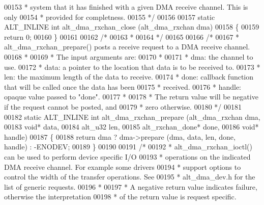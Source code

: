 \begin{DoxyCode}
00153 \textcolor{comment}{ * system that it has finished with a given DMA receive channel. This is only}
00154 \textcolor{comment}{ * provided for completness.}
00155 \textcolor{comment}{ */}
00156 
00157 \textcolor{keyword}{static} ALT_INLINE \textcolor{keywordtype}{int} alt_dma_rxchan_close (alt_dma_rxchan dma)
00158 \{
00159   \textcolor{keywordflow}{return} 0;
00160 \}
00161 
00162 \textcolor{comment}{/*}
00163 \textcolor{comment}{ *}
00164 \textcolor{comment}{ */}
00165 
00166 \textcolor{comment}{/*}
00167 \textcolor{comment}{ * alt\_dma\_rxchan\_prepare() posts a receive request to a DMA receive channel.}
00168 \textcolor{comment}{ * }
00169 \textcolor{comment}{ * The input arguments are:}
00170 \textcolor{comment}{ *}
00171 \textcolor{comment}{ * dma: the channel to use.}
00172 \textcolor{comment}{ * data: a pointer to the location that data is to be received to.}
00173 \textcolor{comment}{ * len: the maximum length of the data to receive. }
00174 \textcolor{comment}{ * done: callback function that will be called once the data has been }
00175 \textcolor{comment}{ *       received.}
00176 \textcolor{comment}{ * handle: opaque value passed to "done".}
00177 \textcolor{comment}{ *}
00178 \textcolor{comment}{ * The return value will be negative if the request cannot be posted, and}
00179 \textcolor{comment}{ * zero otherwise.}
00180 \textcolor{comment}{ */}
00181 
00182 \textcolor{keyword}{static} ALT_INLINE \textcolor{keywordtype}{int} alt_dma_rxchan_prepare (alt_dma_rxchan   dma, 
00183                                               \textcolor{keywordtype}{void}*            data,
00184                                               alt_u32          len,
00185                                               alt_rxchan_done* done,  
00186                                               \textcolor{keywordtype}{void}*            handle)
00187 \{
00188   \textcolor{keywordflow}{return} dma ? dma->prepare (dma, data, len, done, handle) : -ENODEV;
00189 \}
00190 
00191 \textcolor{comment}{/*}
00192 \textcolor{comment}{ * alt\_dma\_rxchan\_ioctl() can be used to perform device specific I/O }
00193 \textcolor{comment}{ * operations on the indicated DMA receive channel. For example some drivers}
00194 \textcolor{comment}{ * support options to control the width of the transfer operations. See}
00195 \textcolor{comment}{ * alt\_dma\_dev.h for the list of generic requests.}
00196 \textcolor{comment}{ *}
00197 \textcolor{comment}{ * A negative return value indicates failure, otherwise the interpretation}
00198 \textcolor{comment}{ * of the return value is request specific.  }

\end{DoxyCode}
